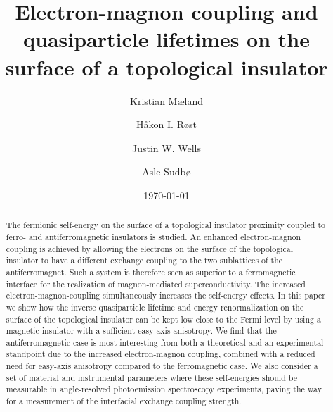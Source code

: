 \documentclass[aps, prb, twocolumn,amsmath,amssymb,floatfix]{revtex4-2}
\begin{document}
\title{Electron-magnon coupling and quasiparticle lifetimes on the surface of a topological insulator}

\author{Kristian M{\ae}land} 
\author{H{\aa}kon I. R{\o}st} 
\author{Justin W. Wells} 
\author{Asle Sudb{\o}}
    

\date{\today} 

\begin{abstract}
The fermionic self-energy on the surface of a topological insulator proximity coupled to ferro- and antiferromagnetic insulators is studied. 
An enhanced electron-magnon coupling is achieved by allowing the electrons on the surface of the topological insulator to have a different exchange coupling to the two sublattices of the antiferromagnet. Such a system is therefore seen as superior to a ferromagnetic interface for the realization of magnon-mediated superconductivity. 
The increased electron-magnon-coupling simultaneously increases the self-energy effects. In this paper we show how the inverse quasiparticle lifetime and energy renormalization on the surface of the topological insulator can be kept low close to the Fermi level by using a magnetic insulator with a sufficient easy-axis anisotropy.
We find that the antiferromagnetic case is most interesting from both a theoretical and an experimental standpoint due to the increased electron-magnon coupling, combined with a reduced need for easy-axis anisotropy compared to the ferromagnetic case.
We also consider a set of material and instrumental parameters where these self-energies should be measurable in angle-resolved photoemission spectroscopy experiments, paving the way for a measurement of the interfacial exchange coupling strength.
\end{abstract}
\end{document}
